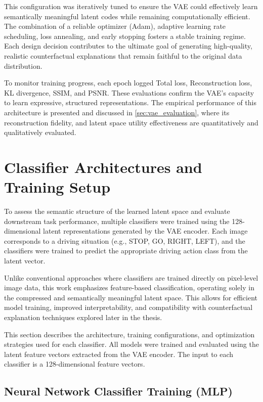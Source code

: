 This configuration was iteratively tuned to ensure the VAE could effectively learn semantically meaningful latent codes while remaining computationally efficient. The combination of a reliable optimizer (Adam), adaptive learning rate scheduling, loss annealing, and early stopping fosters a stable training regime. Each design decision contributes to the ultimate goal of generating high-quality, realistic counterfactual explanations that remain faithful to the original data distribution.

To monitor training progress, each epoch logged Total loss, Reconstruction loss, KL divergence, SSIM, and PSNR. These evaluations confirm the VAE's capacity to learn expressive, structured representations. The empirical performance of this architecture is presented and discussed in \cref{sec:vae_evaluation}, where its reconstruction fidelity, and latent space utility effectiveness are quantitatively and qualitatively evaluated.



\section{Classifier Architectures and Training Setup}
\label{sec:classifier_architectures}


To assess the semantic structure of the learned latent space and evaluate downstream task performance, multiple classifiers were trained using the 128-dimensional latent representations generated by the VAE encoder. Each image corresponds to a driving situation (e.g., STOP, GO, RIGHT, LEFT), and the classifiers were trained to predict the appropriate driving action class from the latent vector.

Unlike conventional approaches where classifiers are trained directly on pixel-level image data, this work emphasizes feature-based classification, operating solely in the compressed and semantically meaningful latent space. This allows for efficient model training, improved interpretability, and compatibility with counterfactual explanation techniques explored later in the thesis.

This section describes the architecture, training configurations, and optimization strategies used for each classifier. All models were trained and evaluated using the latent feature vectors extracted from the VAE encoder. The input to each classifier is a 128-dimensional feature vectors.

\subsection{Neural Network Classifier Training (MLP)} \label{subsec:neural_network_classifier_training}

